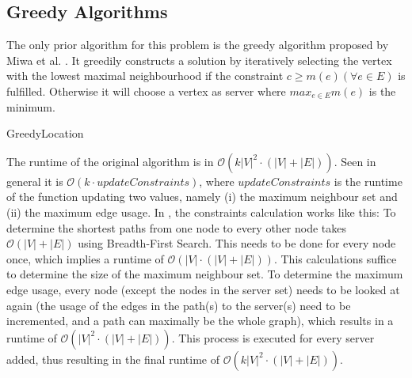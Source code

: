\documentclass [12pt]{article}
\begin{document}
\subsection{Greedy Algorithms}
The only prior algorithm for this problem is the greedy algorithm proposed by
Miwa et al. \cite{mirrorserver}. It greedily constructs a solution by iteratively selecting the vertex with the 
lowest maximal neighbourhood if the constraint $c\geq m(e) (\forall e \in E)$ is fulfilled. 
Otherwise it will choose a vertex as server where $max_{e \in E}m(e)$ is the minimum.
\begin{algorithm}[H]
  \caption{GreedyLocation}
\end{algorithm}
The runtime of the original algorithm is in $\mathcal O(k|V|^{2} \cdot (|V|+|E|))$. Seen in general it is $\mathcal O(k \cdot updateConstraints)$, where
$updateConstraints$ is the runtime of the function updating two values, namely (i) the maximum neighbour set and (ii) the maximum edge usage. 
In \cite{mirrorserver}, the constraints calculation works like this:
To determine the shortest paths from one node to every other node takes 
$\mathcal O(|V|+|E|)$ using Breadth-First Search. This needs to be done for every node once,
which implies a runtime of $\mathcal O(|V| \cdot (|V|+|E|))$. 
This calculations suffice to determine the size of the maximum neighbour set. To determine the maximum
edge usage, every node (except the nodes in the server set) needs to be looked 
at again (the usage of the edges in the
path(s) to the server(s) need to be incremented, and a path can maximally be the whole graph), 
which results in a runtime of $\mathcal O(|V|^{2} \cdot (|V|+|E|))$.   
This process is executed for every server added, thus resulting in the final runtime of
$\mathcal O(k|V|^{2} \cdot (|V|+|E|))$. 
\end{document}
